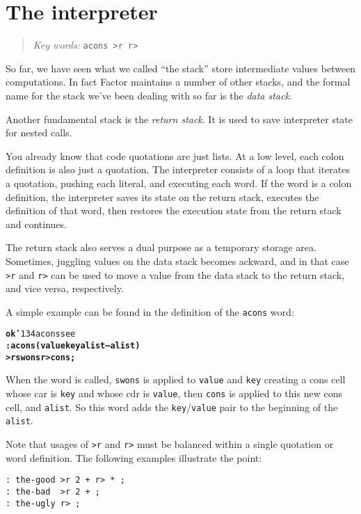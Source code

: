 \documentclass[english]{book}
\newcommand{\ttbackslash}{\char'134}
\newcommand{\chapkeywords}[1]{{\parbox{10cm}{\begin{minipage}[b]{10cm}
\begin{quote}
\emph{Key words:} \texttt{#1}
\end{quote}
\end{minipage}}}}
\begin{document}
\section{The interpreter}

\chapkeywords{acons >r r>}

So far, we have seen what we called ``the stack'' store intermediate values between computations. In fact Factor maintains a number of other stacks, and the formal name for the stack we've been dealing with so far is the \emph{data stack}.

Another fundamental stack is the \emph{return stack}. It is used to save interpreter state for nested calls.

You already know that code quotations are just lists. At a low level, each colon definition is also just a quotation. The interpreter consists of a loop that iterates a quotation, pushing each literal, and executing each word. If the word is a colon definition, the interpreter saves its state on the return stack, executes the definition of that word, then restores the execution state from the return stack and continues.

The return stack also serves a dual purpose as a temporary storage area. Sometimes, juggling values on the data stack becomes ackward, and in that case \texttt{>r} and \texttt{r>} can be used to move a value from the data stack to the return stack, and vice versa, respectively.

A simple example can be found in the definition of the \texttt{acons} word:

\begin{alltt}
\textbf{ok} \ttbackslash acons see
\textbf{: acons ( value key alist -- alist )
    >r swons r> cons ;}
\end{alltt}

When the word is called, \texttt{swons} is applied to \texttt{value} and \texttt{key} creating a cons cell whose car is \texttt{key} and whose cdr is \texttt{value}, then \texttt{cons} is applied to this new cons cell, and \texttt{alist}. So this word adds the \texttt{key}/\texttt{value} pair to the beginning of the \texttt{alist}.

Note that usages of \texttt{>r} and \texttt{r>} must be balanced within a single quotation or word definition. The following examples illustrate the point:

\begin{verbatim}
: the-good >r 2 + r> * ;
: the-bad  >r 2 + ;
: the-ugly r> ;
\end{verbatim}
\end{document}
